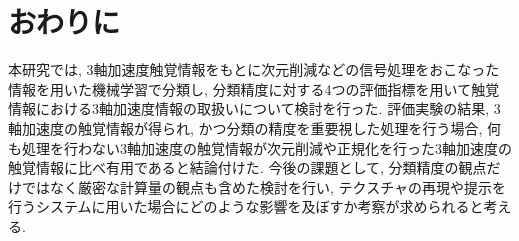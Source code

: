 \chapter{おわりに}
\label{chap:conc}
本研究では, 3軸加速度触覚情報をもとに次元削減などの信号処理をおこなった情報を用いた機械学習で分類し, 分類精度に対する4つの評価指標を用いて触覚情報における3軸加速度情報の取扱いについて検討を行った. 
評価実験の結果, 3軸加速度の触覚情報が得られ, かつ分類の精度を重要視した処理を行う場合, 何も処理を行わない3軸加速度の触覚情報が次元削減や正規化を行った3軸加速度の触覚情報に比べ有用であると結論付けた. 今後の課題として, 分類精度の観点だけではなく厳密な計算量の観点も含めた検討を行い, テクスチャの再現や提示を行うシステムに用いた場合にどのような影響を及ぼすか考察が求められると考える.


